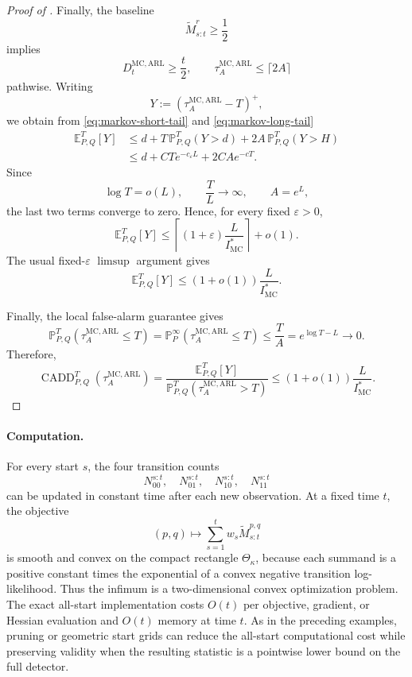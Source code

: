 \documentclass[12pt]{article}
\theoremstyle{spaced}
\theoremstyle{remark}
\begin{document}
\begin{proof}[Proof of ]
Finally, the baseline
\[
    \widetilde M_{s:t}^{r}\ge\frac12
\]
implies
\[
    D_t^{\mathrm{MC},\mathrm{ARL}}\ge\frac t2,
    \qquad
    \tau_A^{\mathrm{MC},\mathrm{ARL}}\le\lceil2A\rceil
\]
pathwise. Writing
\[
    Y
    :=
    \left(
        \tau_A^{\mathrm{MC},\mathrm{ARL}}-T
    \right)^+,
\]
we obtain from \eqref{eq:markov-short-tail} and
\eqref{eq:markov-long-tail}
\begin{align*}
    \mathbb E_{P,Q}^{T}[Y]
    &\le
    d
    +
    T\,\mathbb P_{P,Q}^{T}(Y>d)
    +
    2A\,\mathbb P_{P,Q}^{T}(Y>H)\\
    &\le
    d
    +
    CTe^{-c_\varepsilon L}
    +
    2CAe^{-cT}.
\end{align*}
Since
\[
    \log T=o(L),
    \qquad
    \frac TL\to\infty,
    \qquad
    A=e^L,
\]
the last two terms converge to zero. Hence, for every fixed
\(\varepsilon>0\),
\[
    \mathbb E_{P,Q}^{T}[Y]
    \le
    \left\lceil
        (1+\varepsilon)
        \frac{L}{I_{\mathrm{MC}}^*}
    \right\rceil
    +o(1).
\]
The usual fixed-\(\varepsilon\) \(\limsup\) argument gives
\[
    \mathbb E_{P,Q}^{T}[Y]
    \le
    (1+o(1))
    \frac{L}{I_{\mathrm{MC}}^*}.
\]

Finally, the local false-alarm guarantee gives
\[
    \mathbb P_{P,Q}^{T}
    \left(
        \tau_A^{\mathrm{MC},\mathrm{ARL}}\le T
    \right)
    =
    \mathbb P_{P}^{\infty}
    \left(
        \tau_A^{\mathrm{MC},\mathrm{ARL}}\le T
    \right)
    \le
    \frac TA
    =
    e^{\log T-L}
    \longrightarrow0.
\]
Therefore,
\[
    \operatorname{CADD}_{P,Q}^{T}
    \left(
        \tau_A^{\mathrm{MC},\mathrm{ARL}}
    \right)
    =
    \frac{
        \mathbb E_{P,Q}^{T}[Y]
    }{
        \mathbb P_{P,Q}^{T}
        (\tau_A^{\mathrm{MC},\mathrm{ARL}}>T)
    }
    \le
    (1+o(1))
    \frac{L}{I_{\mathrm{MC}}^*}.
\]
\end{proof}

\paragraph{Computation.}
For every start \(s\), the four transition counts
\[
    N_{00}^{s:t},\quad N_{01}^{s:t},\quad
    N_{10}^{s:t},\quad N_{11}^{s:t}
\]
can be updated in constant time after each new observation.  At a
fixed time \(t\), the objective
\[
    (p,q)
    \longmapsto
    \sum_{s=1}^t
    w_s\widetilde M_{s:t}^{p,q}
\]
is smooth and convex on the compact rectangle
\(\Theta_\kappa\), because each summand is a positive constant times
the exponential of a convex negative transition log-likelihood.
Thus the infimum is a two-dimensional convex optimization problem.
The exact all-start implementation costs \(O(t)\) per objective,
gradient, or Hessian evaluation and \(O(t)\) memory at time \(t\).
As in the preceding examples, pruning or geometric start grids can
reduce the all-start computational cost while preserving validity
when the resulting statistic is a pointwise lower bound on the full
detector.
\end{document}

